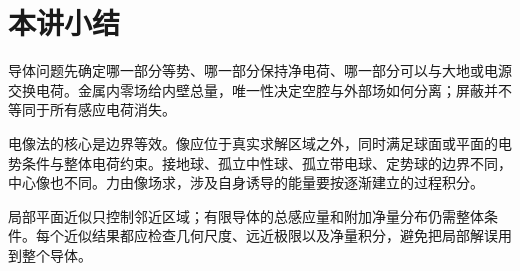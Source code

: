 \section{本讲小结}

导体问题先确定哪一部分等势、哪一部分保持净电荷、哪一部分可以与大地或电源交换电荷。金属内零场给内壁总量，唯一性决定空腔与外部场如何分离；屏蔽并不等同于所有感应电荷消失。

电像法的核心是边界等效。像应位于真实求解区域之外，同时满足球面或平面的电势条件与整体电荷约束。接地球、孤立中性球、孤立带电球、定势球的边界不同，中心像也不同。力由像场求，涉及自身诱导的能量要按逐渐建立的过程积分。

局部平面近似只控制邻近区域；有限导体的总感应量和附加净量分布仍需整体条件。每个近似结果都应检查几何尺度、远近极限以及净量积分，避免把局部解误用到整个导体。

